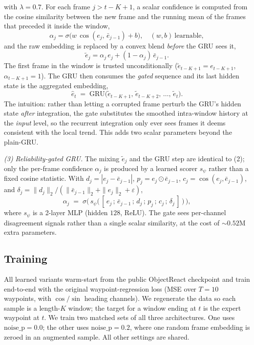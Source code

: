 \documentclass[conference]{IEEEtran}
\begin{document}
with $\lambda{=}0.7$. For each frame $j > t{-}K{+}1$, a scalar
confidence is computed from the cosine similarity between the new
frame and the running mean of the frames that preceded it inside the
window,
\begin{equation}
\alpha_j = \sigma\!\big(w\,\cos(e_j,\,\bar{e}_{j-1}) + b\big),\quad
(w,b)\ \text{learnable},
\end{equation}
and the raw embedding is replaced by a convex blend \emph{before} the
GRU sees it,
\begin{equation}
\tilde{e}_j = \alpha_j\,e_j + (1-\alpha_j)\,\bar{e}_{j-1}.
\end{equation}
The first frame in the window is trusted unconditionally
($\tilde{e}_{t-K+1} = e_{t-K+1}$, $\alpha_{t-K+1}{=}1$).
The GRU then consumes the \emph{gated} sequence and its last hidden
state is the aggregated embedding,
\begin{equation}
\hat{e}_t \;=\; \mathrm{GRU}\!\big(\tilde{e}_{t-K+1},\,\tilde{e}_{t-K+2},\,\dots,\,\tilde{e}_t\big).
\end{equation}
The intuition: rather than letting a corrupted frame perturb the GRU's
hidden state \emph{after} integration, the gate substitutes the
smoothed intra-window history at the \emph{input} level, so the
recurrent integration only ever sees frames it deems consistent with
the local trend. This adds two scalar parameters beyond the plain-GRU.

\emph{(3) Reliability-gated GRU.} The mixing $\tilde{e}_j$ and the GRU
step are identical to (2); only the per-frame confidence $\alpha_j$ is
produced by a learned scorer $s_\psi$ rather than a fixed cosine
statistic. With $d_j = |e_j-\bar{e}_{j-1}|$, $p_j = e_j\odot\bar{e}_{j-1}$,
$c_j = \cos(e_j,\bar{e}_{j-1})$, and
$\delta_j = \|d_j\|_2 / (\|\bar{e}_{j-1}\|_2+\|e_j\|_2+\varepsilon)$,
\begin{equation}
\alpha_j \;=\; \sigma\!\big(\,s_\psi\!\big(\,[\,e_j\,;\,\bar{e}_{j-1}\,;\,d_j\,;\,p_j\,;\,c_j\,;\,\delta_j\,]\,\big)\,\big),
\end{equation}
where $s_\psi$ is a 2-layer MLP (hidden $128$, ReLU). The gate sees
per-channel disagreement signals rather than a single scalar similarity,
at the cost of $\sim$$0.52$M extra parameters.


\subsection{Training}
All learned variants warm-start from the public ObjectReact checkpoint and train end-to-end with the original waypoint-regression loss (MSE over $T{=}10$ waypoints, with $\cos/\sin$ heading channels). We regenerate the data so each sample is a length-$K$ window; the target for a window ending at $t$ is the expert waypoint at $t$. We train two matched sets of all three architectures. One uses $\mathrm{noise\_p}{=}0.0$; the other uses $\mathrm{noise\_p}{=}0.2$, where one random frame embedding is zeroed in an augmented sample. All other settings are shared.
\end{document}
